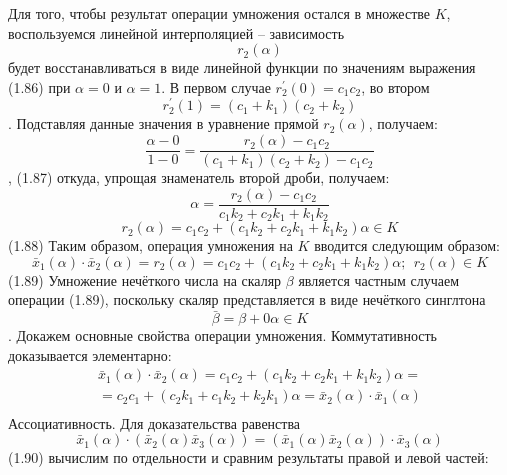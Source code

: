 Для того, чтобы результат операции умножения остался в множестве $K$, воспользуемся линейной интерполяцией – зависимость \[{{r}_{2}}(\alpha )\] будет восстанавливаться в виде линейной функции по значениям выражения (1.86) при $\alpha =0$ и $\alpha =1$. В первом случае $r_{2}^{'}\left( 0 \right)={{c}_{1}}{{c}_{2}}$, во втором \[r_{2}^{'}\left( 1 \right)=\left( {{c}_{1}}+{{k}_{1}} \right)\left( {{c}_{2}}+{{k}_{2}} \right)\]. Подставляя данные значения в уравнение прямой ${{r}_{2}}\left( \alpha  \right)$, получаем:
	\[\frac{\alpha -0}{1-0}=\frac{{{r}_{2}}\left( \alpha  \right)-{{c}_{1}}{{c}_{2}}}{\left( {{c}_{1}}+{{k}_{1}} \right)\left( {{c}_{2}}+{{k}_{2}} \right)-{{c}_{1}}{{c}_{2}}}\],	(1.87)
откуда, упрощая знаменатель второй дроби, получаем:
	\[\alpha =\frac{{{r}_{2}}\left( \alpha  \right)-{{c}_{1}}{{c}_{2}}}{{{c}_{1}}{{k}_{2}}+{{c}_{2}}{{k}_{1}}+{{k}_{1}}{{k}_{2}}}\] 	\[{{r}_{2}}\left( \alpha  \right)={{c}_{1}}{{c}_{2}}+\left( {{c}_{1}}{{k}_{2}}+{{c}_{2}}{{k}_{1}}+{{k}_{1}}{{k}_{2}} \right)\alpha \in K\] 	(1.88)
Таким образом, операция умножения на $K$ вводится следующим образом:
	\[{{\bar{x}}_{1}}(\alpha )\cdot {{\bar{x}}_{2}}(\alpha )={{r}_{2}}\left( \alpha  \right)={{c}_{1}}{{c}_{2}}+({{c}_{1}}{{k}_{2}}+{{c}_{2}}{{k}_{1}}+{{k}_{1}}{{k}_{2}})\alpha ;\ \ {{r}_{2}}\left( \alpha  \right)\in K\] 	(1.89)
Умножение нечёткого числа на скаляр $\beta $ является частным случаем операции (1.89), поскольку скаляр представляется в виде нечёткого синглтона
	\[\bar{\beta }=\beta +0\alpha \in K\].
Докажем основные свойства операции умножения.
Коммутативность доказывается элементарно:
	\[\begin{matrix}
  {{{\bar{x}}}_{1}}(\alpha )\cdot {{{\bar{x}}}_{2}}(\alpha )={{c}_{1}}{{c}_{2}}+({{c}_{1}}{{k}_{2}}+{{c}_{2}}{{k}_{1}}+{{k}_{1}}{{k}_{2}})\alpha = \\ 
  ={{c}_{2}}{{c}_{1}}+\left( {{c}_{2}}{{k}_{1}}+{{c}_{1}}{{k}_{2}}+{{k}_{2}}{{k}_{1}} \right)\alpha ={{{\bar{x}}}_{2}}(\alpha )\cdot {{{\bar{x}}}_{1}}(\alpha ) \\ 
\end{matrix}\] 
Ассоциативность. Для доказательства равенства
	\[{{\bar{x}}_{1}}\left( \alpha  \right)\cdot \left( {{{\bar{x}}}_{2}}\left( \alpha  \right){{{\bar{x}}}_{3}}\left( \alpha  \right) \right)=\left( {{{\bar{x}}}_{1}}\left( \alpha  \right){{{\bar{x}}}_{2}}\left( \alpha  \right) \right)\cdot {{\bar{x}}_{3}}\left( \alpha  \right)\] 	(1.90)
вычислим по отдельности и сравним результаты правой и левой частей:
